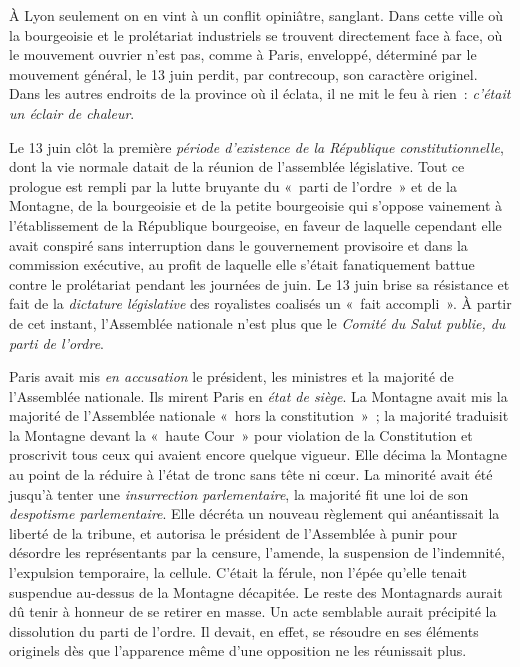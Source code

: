 \documentclass[twoside]{book} %
\begin{document}
À Lyon seulement on en vint à un conflit opiniâtre, sanglant. Dans cette ville où la bourgeoisie et le prolétariat industriels se trouvent directement face à face, où le mouvement ouvrier n’est pas, comme à Paris, enveloppé, déterminé par le mouvement général, le 13 juin perdit, par contrecoup, son caractère originel. Dans les autres endroits de la province où il éclata, il ne mit le feu à rien : \emph{c’était un éclair de chaleur}.\par
Le 13 juin clôt la première \emph{période d’existence de la République constitutionnelle}, dont la vie normale datait de la réunion de l’assemblée législative. Tout ce prologue est rempli par la lutte bruyante du « parti de l’ordre » et de la Montagne, de la bourgeoisie et de la petite bourgeoisie qui s’oppose vainement à l’établissement de la République bourgeoise, en faveur de laquelle cependant elle avait conspiré sans interruption dans le gouvernement provisoire et dans la commission exécutive, au profit de laquelle elle s’était fanatiquement battue contre le prolétariat pendant les journées de juin. Le 13 juin brise sa résistance et fait de la \emph{dictature législative} des royalistes coalisés un « fait accompli ». À partir de cet instant, l’Assemblée nationale n’est plus que le \emph{Comité du Salut publie, du parti de l’ordre}.\par
Paris avait mis \emph{en accusation} le président, les ministres et la majorité de l’Assemblée nationale. Ils mirent Paris en \emph{état de siège}. La Montagne avait mis la majorité de l’Assemblée nationale « hors la constitution » ; la majorité traduisit la Montagne devant la « haute Cour » pour violation de la Constitution et proscrivit tous ceux qui avaient encore quelque vigueur. Elle décima la Montagne au point de la réduire à l’état de tronc sans tête ni cœur. La minorité avait été jusqu’à tenter une \emph{insurrection parlementaire}, la majorité fit une loi de son \emph{despotisme parlementaire}. Elle décréta un nouveau règlement qui anéantissait la liberté de la tribune, et autorisa le président de l’Assemblée à punir pour désordre les représentants par la censure, l’amende, la suspension de l’indemnité, l’expulsion temporaire, la cellule. C’était la férule, non l’épée qu’elle tenait suspendue au-dessus de la Montagne décapitée. Le reste des Montagnards aurait dû tenir à honneur de se retirer en masse. Un acte semblable aurait précipité la dissolution du parti de l’ordre. Il devait, en effet, se résoudre en ses éléments originels dès que l’apparence même d’une opposition ne les réunissait plus.\par
\end{document}
